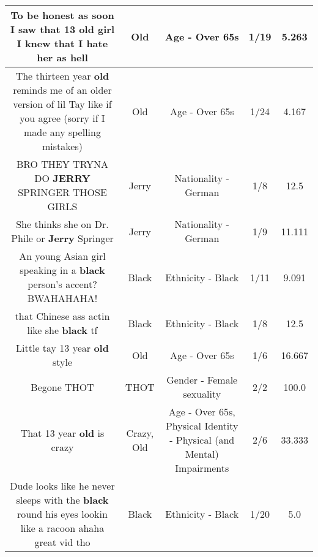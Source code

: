 \documentclass[11pt]{article}
\newlength\mylength
\begin{document}
\begin{center}
\begin{longtable}{|C{.65\mylength}|C{.30\mylength}|C{.12\mylength}|C{.12\mylength}|C{.12\mylength}|}
  \small To be honest as soon I saw that 13 \textbf{old} girl I knew that I hate her as hell\normalsize   & Old & Age - Over 65s & 1/19 & 5.263 \\  \hline
  \small The thirteen year \textbf{old} reminds me of an older version of lil Tay like if you agree (sorry if I made any spelling mistakes)\normalsize   & Old & Age - Over 65s & 1/24 & 4.167 \\  \hline
  \small BRO THEY TRYNA DO \textbf{JERRY} SPRINGER THOSE GIRLS\normalsize   & Jerry & Nationality - German & 1/8 & 12.5 \\  \hline
  \small She thinks she on Dr. Phile or \textbf{Jerry} Springer\normalsize   & Jerry & Nationality - German & 1/9 & 11.111 \\  \hline
  \small An young Asian girl speaking in a \textbf{black} person's accent? BWAHAHAHA!\normalsize   & Black & Ethnicity - Black & 1/11 & 9.091 \\  \hline
  \small that Chinese ass actin like she \textbf{black} tf\normalsize   & Black & Ethnicity - Black & 1/8 & 12.5 \\  \hline
  \small Little tay 13 year \textbf{old} style\normalsize   & Old & Age - Over 65s & 1/6 & 16.667 \\  \hline
  \small Begone THOT\normalsize   & THOT & Gender - Female sexuality & 2/2 & 100.0 \\  \hline
  \small That 13 year \textbf{old} is crazy\normalsize   & Crazy, Old & Age - Over 65s, Physical Identity - Physical (and Mental) Impairments & 2/6 & 33.333 \\  \hline
  \small Dude looks like he never sleeps with the \textbf{black} round his eyes lookin like a racoon ahaha great vid tho\normalsize   & Black & Ethnicity - Black & 1/20 & 5.0 \\  \hline

\end{longtable}
\end{center}
\end{document}
